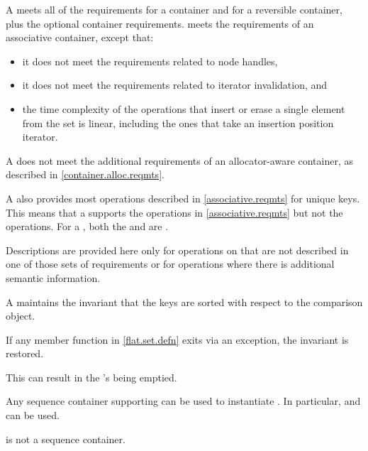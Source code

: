 \pnum
A  meets all of the requirements
for a container and
for a reversible container,
plus the optional container requirements.
 meets the requirements of
an associative container, except that:
\begin{itemize}
\item
it does not meet the requirements
related to node handles,
\item
it does not meet the requirements related to iterator invalidation, and
\item
the time complexity of the operations
that insert or erase a single element from the set
is linear,
including the ones that take an insertion position iterator.
\end{itemize}
\begin{note}
A  does not meet
the additional requirements of an allocator-aware container,
as described in \ref{container.alloc.reqmts}.
\end{note}

\pnum
A  also provides most operations
described in \ref{associative.reqmts} for unique keys.
This means that a  supports
the  operations in \ref{associative.reqmts}
but not the  operations.
For a ,
both the  and  are .

\pnum
Descriptions are provided here only for operations on 
that are not described in one of those sets of requirements or
for operations where there is additional semantic information.

\pnum
A  maintains the invariant that the keys are sorted with
respect to the comparison object.

\pnum
If any member function in \ref{flat.set.defn} exits via an exception,
the invariant is restored.
\begin{note}
This can result in the 's being emptied.
\end{note}

\pnum
Any sequence container
supporting 
can be used to instantiate .
In particular,  and 
can be used.
\begin{note}
 is not a sequence container.
\end{note}

